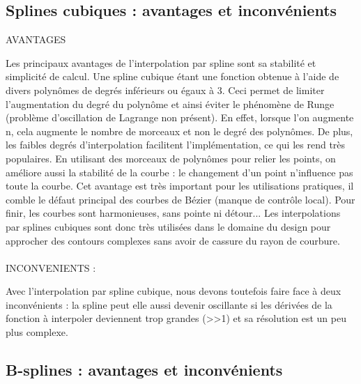 \documentclass{article}
\begin{document}
\newpage
\subsection{Splines cubiques : avantages et inconv\'{e}nients}

\begin{flushleft}
AVANTAGES
\end{flushleft}
\par
Les principaux avantages de l'interpolation par spline sont sa stabilit\'{e} et simplicit\'{e} de calcul.
Une spline cubique \'{e}tant une fonction obtenue \`{a} l'aide de divers polyn\^{o}mes de degr\'{e}s inf\'{e}rieurs ou \'{e}gaux \`{a} 3. Ceci permet de limiter l'augmentation du degr\'{e} du polyn\^{o}me et ainsi \'{e}viter le ph\'{e}nom\`{e}ne de Runge (probl\`{e}me d'oscillation de Lagrange non pr\'{e}sent). En effet, lorsque l'on augmente n, cela augmente le nombre de morceaux et non le degr\'{e} des polyn\^{o}mes.
De plus, les faibles degr\'{e}s d'interpolation facilitent l'impl\'{e}mentation, ce qui les rend tr\`{e}s populaires.
En utilisant des morceaux de polyn\^{o}mes pour relier les points, on am\'{e}liore aussi la stabilit\'{e} de la courbe : le changement d'un point n'influence pas toute la courbe. Cet avantage est tr\`{e}s important pour les utilisations pratiques, il comble le d\'{e}faut principal des courbes de B\'{e}zier (manque de contr\^{o}le local).
Pour finir, les courbes sont harmonieuses, sans pointe ni d\'{e}tour... Les interpolations par splines cubiques sont donc tr\`{e}s utilis\'{e}es dans le domaine du design pour approcher des contours complexes sans avoir de cassure du rayon de courbure.
\\\\
INCONVENIENTS :
\\
\par
Avec l'interpolation par spline cubique, nous devons toutefois faire face \`{a} deux inconv\'{e}nients : la spline peut elle aussi devenir oscillante si les d\'{e}riv\'{e}es de la fonction \`{a} interpoler deviennent trop grandes (>>1) et sa r\'{e}solution est un peu plus complexe.

\subsection{B-splines : avantages et inconv\'{e}nients}
\end{document}
